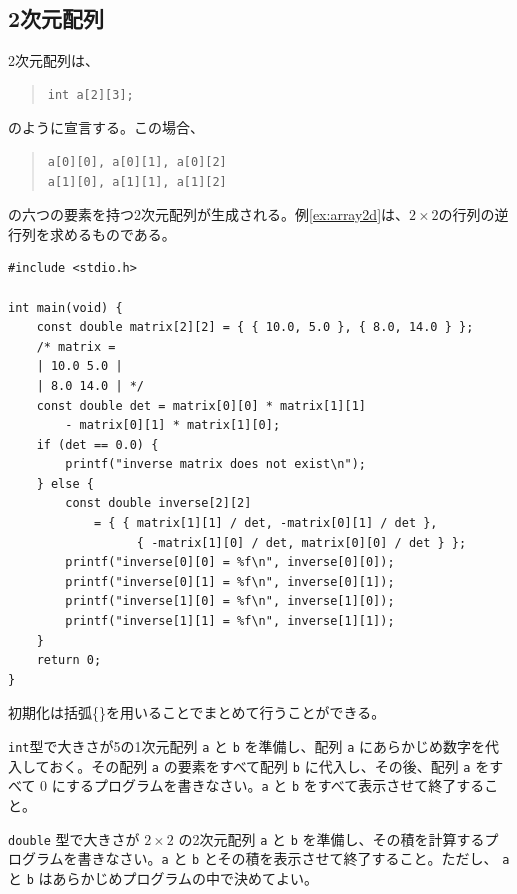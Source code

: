 \subsection{2次元配列}
2次元配列は、
\begin{quote}
    \begin{verbatim}
int a[2][3];
\end{verbatim}
\end{quote}
のように宣言する。この場合、
\begin{quote}
    \begin{verbatim}
a[0][0], a[0][1], a[0][2]
a[1][0], a[1][1], a[1][2]
\end{verbatim}
\end{quote}
の六つの要素を持つ2次元配列が生成される。例\ref{ex:array2d}は、\(2 \times 2\)の行列の逆行列を求めるものである。
\begin{reidai}\label{ex:array2d}
    \begin{verbatim}
#include <stdio.h>

int main(void) {
    const double matrix[2][2] = { { 10.0, 5.0 }, { 8.0, 14.0 } };
    /* matrix =
    | 10.0 5.0 |
    | 8.0 14.0 | */
    const double det = matrix[0][0] * matrix[1][1]
        - matrix[0][1] * matrix[1][0];
    if (det == 0.0) {
        printf("inverse matrix does not exist\n");
    } else {
        const double inverse[2][2]
            = { { matrix[1][1] / det, -matrix[0][1] / det },
                  { -matrix[1][0] / det, matrix[0][0] / det } };
        printf("inverse[0][0] = %f\n", inverse[0][0]);
        printf("inverse[0][1] = %f\n", inverse[0][1]);
        printf("inverse[1][0] = %f\n", inverse[1][0]);
        printf("inverse[1][1] = %f\n", inverse[1][1]);
    }
    return 0;
}
\end{verbatim}
\end{reidai}
初期化は括弧\{\}を用いることでまとめて行うことができる。

\begin{renshuu}\label{prob:3-1}
    \texttt{int}型で大きさが5の1次元配列 \texttt{a} と \texttt{b} を準備し、配列 \texttt{a} にあらかじめ数字を代入しておく。その配列 \texttt{a} の要素をすべて配列 \texttt{b} に代入し、その後、配列 \texttt{a} をすべて 0 にするプログラムを書きなさい。\texttt{a} と \texttt{b} をすべて表示させて終了すること。
\end{renshuu}

\begin{renshuu}\label{prob:3-2}
    \texttt{double} 型で大きさが \(2\times2\) の2次元配列 \texttt{a} と \texttt{b} を準備し、その積を計算するプログラムを書きなさい。\texttt{a} と \texttt{b} とその積を表示させて終了すること。ただし、 \texttt{a} と \texttt{b} はあらかじめプログラムの中で決めてよい。
\end{renshuu}

